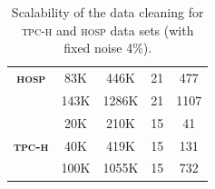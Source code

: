 \begin{table}[t]
\begin{tabular}{@{}ccccc@{}}
{\bf \textsc{hosp}}           & 83K                                                              & 446K                                                        & 21                                                                                                                                        & 477                                                           \\
\multicolumn{1}{l}{} & 143K                                                             & 1286K                                                        & 21                                                                                                                                        & 1107                                                          \\ \midrule
\multicolumn{1}{l}{} & 20K                                                              & 210K                                                        & 15                                                                                                                                        & 41                                                            \\
{\bf \textsc{tpc-h}}           & 40K                                                              & 419K                                                        & 15                                                                                                                                        & 131                                                           \\
\multicolumn{1}{l}{} & 100K                                                             & 1055K                                                        & 15                                                                                                                                        & 732                                                           \\ \bottomrule
\end{tabular}
\caption{\label{tab:runtime} Scalability of the data cleaning for \textsc{tpc-h} and \textsc{hosp} data sets (with fixed noise 4\%). }
\end{table}



